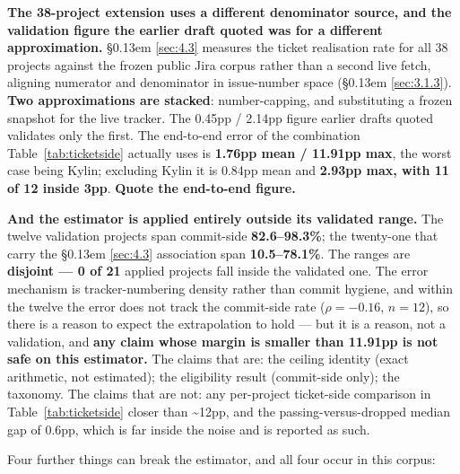 \documentclass[11pt,a4paper]{article}
\begin{document}
\textbf{The 38-project extension uses a different denominator source, and the validation figure the earlier draft quoted was for a different approximation.} \S\kern0.13em \ref{sec:4.3} measures the ticket realisation rate for all 38 projects against the frozen public Jira corpus rather than a second live fetch, aligning numerator and denominator in issue-number space (\S\kern0.13em \ref{sec:3.1.3}). \textbf{Two approximations are stacked}: number-capping, and substituting a frozen snapshot for the live tracker. The 0.45pp / 2.14pp figure earlier drafts quoted validates only the first. The end-to-end error of the combination Table~\ref{tab:ticketside} actually uses is \textbf{1.76pp mean / 11.91pp max}, the worst case being Kylin; excluding Kylin it is 0.84pp mean and \textbf{2.93pp max, with 11 of 12 inside 3pp}. \textbf{Quote the end-to-end figure.}

\textbf{And the estimator is applied entirely outside its validated range.} The twelve validation projects span commit-side \textbf{82.6--98.3\%}; the twenty-one that carry the \S\kern0.13em \ref{sec:4.3} association span \textbf{10.5--78.1\%}. The ranges are \textbf{disjoint --- 0 of 21} applied projects fall inside the validated one. The error mechanism is tracker-numbering density rather than commit hygiene, and within the twelve the error does not track the commit-side rate ($\rho = -0.16$, $n = 12$), so there is a reason to expect the extrapolation to hold --- but it is a reason, not a validation, and \textbf{any claim whose margin is smaller than 11.91pp is not safe on this estimator.} The claims that are: the ceiling identity (exact arithmetic, not estimated); the eligibility result (commit-side only); the taxonomy. The claims that are not: any per-project ticket-side comparison in Table~\ref{tab:ticketside} closer than \textasciitilde{}12pp, and the passing-versus-dropped median gap of 0.6pp, which is far inside the noise and is reported as such.

Four further things can break the estimator, and all four occur in this corpus:
\end{document}
